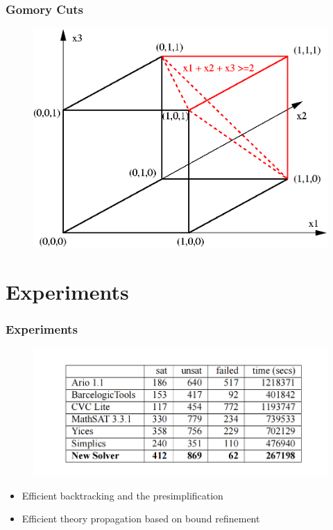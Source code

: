 \documentclass[aspectratio=169%
,serif,mathserif]{beamer}
\begin{document}
\begin{frame}
	\frametitle{Gomory Cuts}
	\begin{figure}[htbp]
		\includegraphics[width=.5\linewidth]{8.png}
	\end{figure}
\end{frame}

\section{Experiments}
\begin{frame}
	\frametitle{Experiments}
	\begin{figure}[htbp]
		\includegraphics[width=.7\linewidth]{5.png}
	\end{figure}
	\begin{itemize}
		\item  Efficient backtracking and the presimplification
		\item  Efficient theory propagation based on bound refinement
	\end{itemize}
\end{frame}








\begin{frame}
\hfill
{}
\linespread{3}\selectfont
\end{frame}
\end{document}
